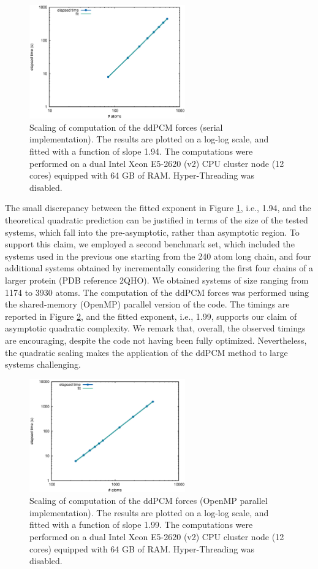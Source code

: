 \begin{figure}[t]
 \caption{Scaling of computation of the ddPCM forces (serial implementation). The results are plotted on a log-log scale, and fitted with a function of slope 1.94. The computations were performed on a dual Intel Xeon E5-2620 (v2) CPU cluster node (12 cores) equipped with 64 GB of RAM. Hyper-Threading was disabled.
 \label{fig:serial}}
 \includegraphics[width=0.6\textwidth]{figs/serial.eps}
\end{figure}

The small discrepancy between the fitted exponent in Figure \ref{fig:serial}, i.e., 1.94, and the theoretical quadratic prediction can be justified in terms of the size of the tested systems, which fall into the pre-asymptotic, rather than asymptotic region. To support this claim, we employed a second benchmark set, which included the systems used in the previous one starting from the 240 atom long chain, and four additional systems obtained by incrementally considering the first four chains of a larger protein (PDB reference 2QHO). We obtained systems of size ranging from 1174 to 3930 atoms. The computation of the ddPCM forces was performed using the shared-memory (OpenMP) parallel version of the code. The timings are reported in
Figure \ref{fig:para}, and the fitted exponent, i.e., 1.99, supports our claim of asymptotic quadratic complexity. We remark that, overall, the observed timings are encouraging, despite the code not having been fully optimized. Nevertheless, the quadratic scaling makes the application of the ddPCM method to large systems challenging. 


\begin{figure}[t]
 \caption{Scaling of computation of the ddPCM forces (OpenMP parallel implementation). The results are plotted on a log-log scale, and fitted with a function of slope 1.99. The computations were performed on a dual Intel Xeon E5-2620 (v2) CPU cluster node (12 cores) equipped with 64 GB of RAM. Hyper-Threading was disabled.
\label{fig:para}}
 \includegraphics[width=0.6\textwidth]{figs/para.eps}
\end{figure}


